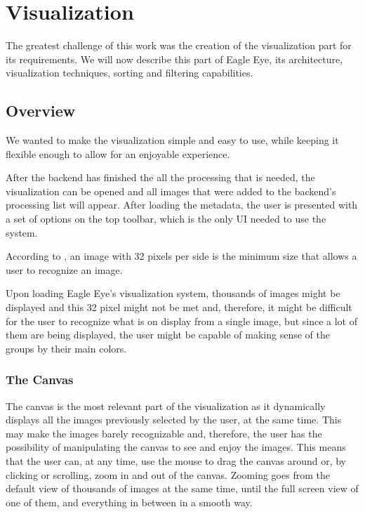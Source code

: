 \section{Visualization} %
\label{sub:visualization}

The greatest challenge of this work was the creation of the visualization part for its requirements. We will now describe this part of Eagle Eye, its architecture, visualization techniques, sorting and filtering capabilities.

\subsection{Overview}
We wanted to make the visualization simple and easy to use, while keeping it flexible enough to allow for an enjoyable experience.

After the backend has finished the all the processing that is needed, the visualization can be opened and all images that were added to the backend's processing list will appear. After loading the metadata, the user is presented with a set of options on the top toolbar, which is the only \ac{UI} needed to use the system. 

According to , an image with 32 pixels per side is the minimum size that allows a user to recognize an image.

 Upon loading Eagle Eye's visualization system, thousands of images might be displayed and this 32 pixel might not be met and, therefore, it might be difficult for the user to recognize what is on display from a single image, but since a lot of them are being displayed, the user might be capable of making sense of the groups by their main colors.

\subsubsection{The Canvas}

The canvas is the most relevant part of the visualization as it dynamically displays all the images previously selected by the user, at the same time. This may make the images barely recognizable and, therefore, the user has the possibility of manipulating the canvas to see and enjoy the images.
This means that the user can, at any time, use the mouse to drag the canvas around or, by clicking or scrolling, zoom in and out of the canvas. Zooming goes from the default view of thousands of images at the same time, until the full screen view of one of them, and everything in between in a smooth way.

